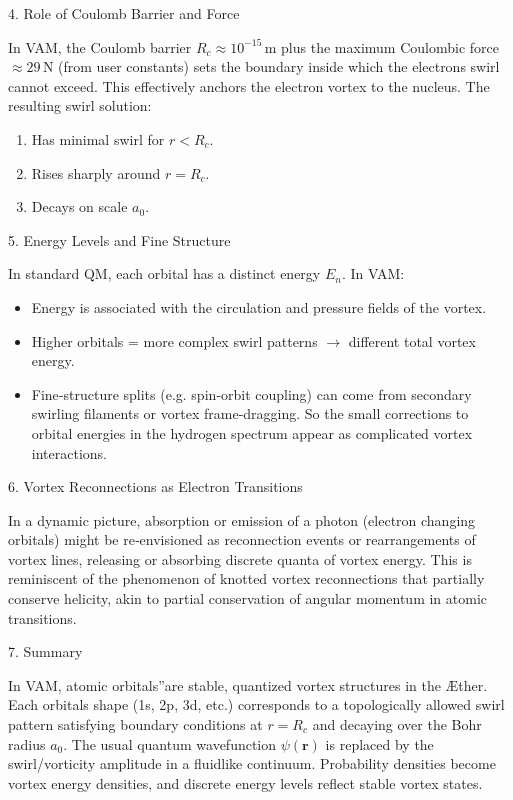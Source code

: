 4. Role of Coulomb Barrier and Force

In VAM, the Coulomb barrier \(R_c \approx 10^{-15}\,\mathrm{m}\) plus the maximum Coulombic force \(\approx 29\,\mathrm{N}\) (from user constants) sets the boundary inside which the electron\rqs s swirl cannot exceed. This effectively anchors the electron vortex to the nucleus. The resulting swirl solution:

\begin{enumerate}
\item Has minimal swirl for \(r < R_c\).
\item Rises sharply around \(r = R_c\).
\item Decays on scale \(a_0\).
\end{enumerate}

5. Energy Levels and Fine Structure

In standard QM, each orbital has a distinct energy \(E_n\). In VAM:

\begin{itemize}
\item Energy is associated with the circulation and pressure fields of the vortex.
\item Higher orbitals = more complex swirl patterns \(\rightarrow\) different total vortex energy.
\item Fine‐structure splits (e.g. spin‐orbit coupling) can come from secondary swirling filaments or vortex frame‐dragging. So the small corrections to orbital energies in the hydrogen spectrum appear as complicated vortex interactions.
\end{itemize}

6. Vortex Reconnections as Electron Transitions

In a dynamic picture, absorption or emission of a photon (electron changing orbitals) might be re‐envisioned as reconnection events or rearrangements of vortex lines, releasing or absorbing discrete quanta of vortex energy. This is reminiscent of the phenomenon of knotted vortex reconnections that partially conserve helicity, akin to partial conservation of angular momentum in atomic transitions.

7. Summary

In VAM, \grqq atomic orbitals\textquotedblright are stable, quantized vortex structures in the Æther. Each orbital\rqs s shape (1s, 2p, 3d, etc.) corresponds to a topologically allowed swirl pattern satisfying boundary conditions at \(r = R_c\) and decaying over the Bohr radius \(a_0\). The usual quantum wavefunction \(\psi(\mathbf{r})\) is replaced by the swirl/vorticity amplitude in a fluidlike continuum. Probability densities become vortex energy densities, and discrete energy levels reflect stable vortex states.


